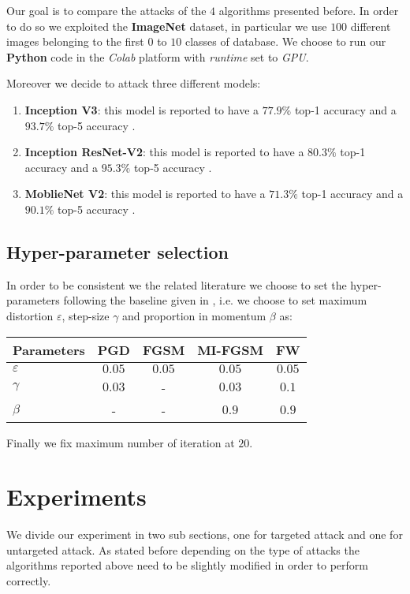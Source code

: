 \documentclass[10pt,twocolumn,letterpaper, english]{article}
\theoremstyle{definition}
\theoremstyle{plain}
\theoremstyle{plain}
\theoremstyle{plain}
\theoremstyle{plain}
\theoremstyle{remark}
\theoremstyle{remark}
\theoremstyle{definition}
\theoremstyle{definition}
\theoremstyle{definition}
\theoremstyle{definition}
\renewcommand{\epsilon}{\varepsilon}
\begin{document}
Our goal is to compare the attacks of the $4$ algorithms presented before. In order to do so we exploited the \textbf{ImageNet} dataset, in particular we use $100$ different images belonging to the first $0$ to $10$ classes of database. We choose to run our \textbf{Python} code in the \textit{Colab} platform with \textit{runtime} set to \textit{GPU}.

Moreover we decide to attack three different models: 
\begin{enumerate}
    \item \textbf{Inception V3}: this model is reported to have a $77.9\%$ top-1 accuracy and a $93.7\%$ top-5 accuracy \cite{keras}.
    \item \textbf{Inception ResNet-V2}: this model is reported to have a $80.3\%$ top-1 accuracy and a	$95.3\%$ top-5 accuracy \cite{keras}.
    \item \textbf{MoblieNet V2}: this model is reported to have a $71.3\%$ top-1 accuracy and a	$90.1\%$ top-5 accuracy \cite{keras}.
    
\end{enumerate}


\subsection{Hyper-parameter selection}

In order to be consistent we the related literature we choose to set the hyper-parameters following the baseline given in \cite{frank}, i.e. we choose to set maximum distortion $\epsilon$, step-size $\gamma$ and proportion in momentum $\beta$ as:


\begin{center}
    \begin{tabular}{l|c|c|c|c}
    \hline
     Parameters & PGD & FGSM & MI-FGSM & FW \\
     \hline
     $\epsilon$ & $0.05$ & $0.05$ & $0.05$ & $0.05$  \\
     
     $\gamma$ & $0.03$ & - & $0.03$ & $0.1$ \\
     
     $\beta$ & - & - & $0.9$ & $0.9$  \\
    \hline
   \end{tabular}
\end{center}

Finally we fix maximum number of iteration at $20$.


\section{Experiments}
We divide our experiment in two sub sections, one for targeted attack and one for untargeted attack. As stated before depending on the type of attacks the algorithms reported above need to be slightly modified in order to perform correctly.
\end{document}
